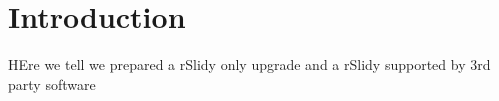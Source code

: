 %
%
% 
% 
% 


\chapter{Introduction}

\label{chap:Intro}

HEre we tell we prepared a rSlidy only upgrade and a rSlidy supported by 3rd party software